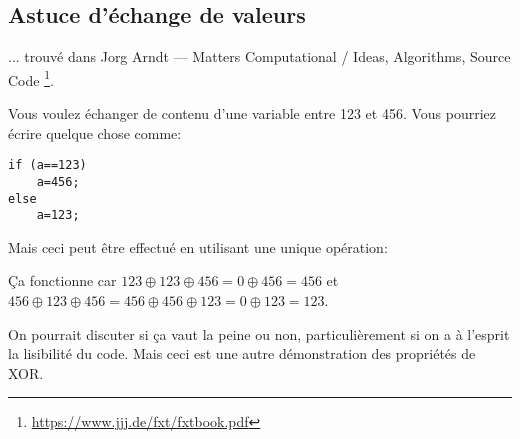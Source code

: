 \subsection{Astuce d'échange de valeurs}

... trouvé dans Jorg Arndt --- Matters Computational / Ideas, Algorithms, Source Code
\footnote{\url{https://www.jjj.de/fxt/fxtbook.pdf}}.

Vous voulez échanger de contenu d'une variable entre 123 et 456.
Vous pourriez écrire quelque chose comme:

\begin{lstlisting}
if (a==123)
    a=456;
else
    a=123;
\end{lstlisting}

Mais ceci peut être effectué en utilisant une unique opération:



Ça fonctionne car $123 \oplus 123 \oplus 456=0 \oplus 456=456$ et
$456 \oplus 123 \oplus 456=456 \oplus 456 \oplus 123=0 \oplus 123=123$.

On pourrait discuter si ça vaut la peine ou non, particulièrement si on a à l'esprit
la lisibilité du code.
Mais ceci est une autre démonstration des propriétés de XOR.

